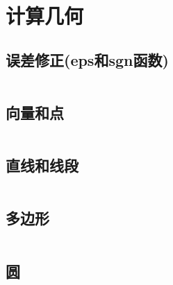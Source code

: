 \documentclass[utf8]{ctexart}
\newcommand{\cpp}[1]{\inputminted[linenos,breaklines,tabsize=4,mathescape]{c++}{#1}}
\begin{document}





\section{计算几何}

\subsection[误差修正]{误差修正(eps和sgn函数)}
\cpp{codes/computational-geometry/sgn.cpp}

\subsection{向量和点}
\cpp{codes/computational-geometry/vec.cpp}

\subsection{直线和线段}
\cpp{codes/computational-geometry/line.cpp}

\subsection{多边形}
\cpp{codes/computational-geometry/polygon.cpp}

\subsection{圆}
\cpp{codes/computational-geometry/circle.cpp}
\end{document}
